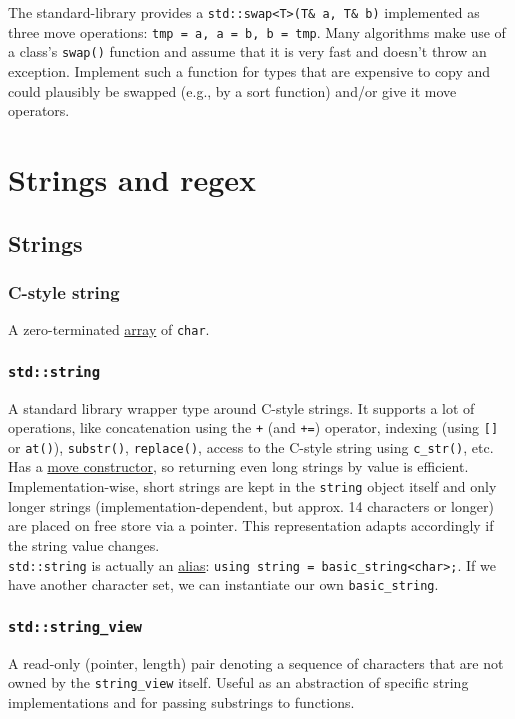 \documentclass[8pt, table, xcdraw]{article}%
\begin{document}
The standard-library provides a \lstinline{std::swap<T>(T& a, T& b)} implemented as three move operations: \lstinline{tmp = a, a = b, b = tmp}. Many algorithms make use of a class's \lstinline{swap()} function and assume that it is very fast and doesn’t throw an exception. Implement such a function for types that are expensive to copy and could plausibly be swapped (e.g., by a sort function) and/or give it move operators.

\section{Strings and regex}

\subsection{Strings}

\subsubsection{C-style string}
A zero-terminated \hyperref[array]{array} of \lstinline{char}.

\subsubsection{\lstinline{std::string}} \label{string}
A standard library wrapper type around C-style strings. It supports a lot of operations, like concatenation using the \lstinline{+} (and \lstinline{+=}) operator, indexing (using \lstinline{[]} or \lstinline{at()}), \lstinline{substr()}, \lstinline{replace()}, access to the C-style string using \lstinline{c_str()}, etc. Has a \hyperref[moveconstructor]{move constructor}, so returning even long strings by value is efficient.\\
Implementation-wise, short strings are kept in the \lstinline{string} object itself and only longer strings (implementation-dependent, but approx. 14 characters or longer) are placed on free store via a pointer. This representation adapts accordingly if the string value changes.\\
\lstinline{std::string} is actually an \hyperref[alias]{alias}: \lstinline{using string = basic_string<char>;}. If we have another character set, we can instantiate our own \lstinline{basic_string}.

\subsubsection{\lstinline{std::string_view}} \label{string_view}
A read-only (pointer, length) pair denoting a sequence of characters that are not owned by the \lstinline{string_view} itself. Useful as an abstraction of specific string implementations and for passing substrings to functions.
\end{document}
